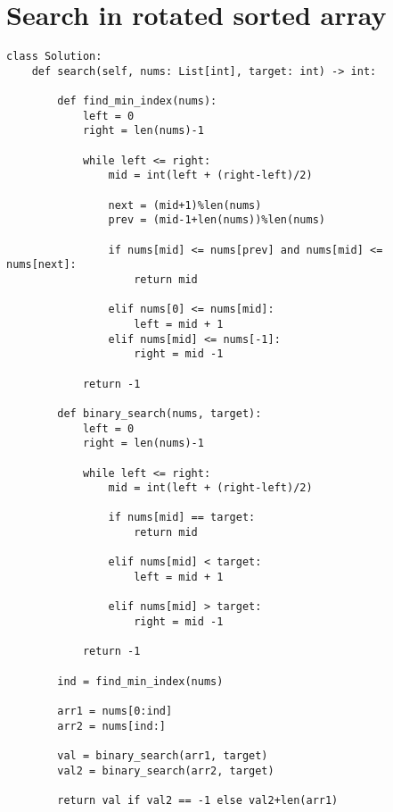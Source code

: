 \documentclass[24pt, a4]{article}
\begin{document}
\section{Search in rotated sorted array}
\begin{lstlisting}
class Solution:
    def search(self, nums: List[int], target: int) -> int:
        
        def find_min_index(nums):
            left = 0
            right = len(nums)-1
            
            while left <= right:
                mid = int(left + (right-left)/2)
                
                next = (mid+1)%len(nums)
                prev = (mid-1+len(nums))%len(nums)
                
                if nums[mid] <= nums[prev] and nums[mid] <= nums[next]:
                    return mid
                
                elif nums[0] <= nums[mid]:
                    left = mid + 1
                elif nums[mid] <= nums[-1]:
                    right = mid -1
            
            return -1
        
        def binary_search(nums, target):
            left = 0
            right = len(nums)-1
            
            while left <= right:
                mid = int(left + (right-left)/2)
                
                if nums[mid] == target:
                    return mid
                
                elif nums[mid] < target:
                    left = mid + 1
                
                elif nums[mid] > target:
                    right = mid -1
            
            return -1
        
        ind = find_min_index(nums)
                
        arr1 = nums[0:ind]
        arr2 = nums[ind:]
        
        val = binary_search(arr1, target)
        val2 = binary_search(arr2, target)
 
        return val if val2 == -1 else val2+len(arr1)
\end{lstlisting}
\end{document}
